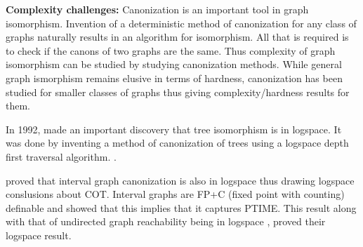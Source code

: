 \documentclass[MS,synopsis]{iitmdiss}
\begin{document}







{\bf Complexity challenges:} Canonization is an important tool in graph isomorphism. Invention of a
deterministic method of canonization for any class of graphs naturally
results in an algorithm for isomorphism. All that is required is to
check if the canons of two graphs are the same. Thus complexity of
graph isomorphism can be studied by studying canonization
methods. While general graph ismorphism remains elusive in terms of
hardness, canonization has been studied for smaller classes of graphs
thus giving complexity/hardness results for them.

In 1992, \cite{sl92} made an important discovery that tree isomorphism
is in logspace. It was done by inventing a method of canonization of
trees using a logspace depth first traversal
algorithm. .

\cite{kklv10} proved that interval graph canonization is also in
logspace thus drawing logspace conslusions about COT. 
Interval graphs are FP+C (fixed point with
counting) definable  and \cite{l10} showed that
this implies that it captures PTIME.  This result
along with that of undirected graph reachability being in logspace
\cite{rei08}, \cite{kklv10} proved their logspace result.\\ 

\end{document}
